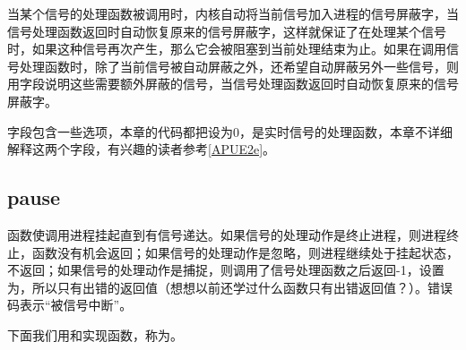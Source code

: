 当某个信号的处理函数被调用时，内核自动将当前信号加入进程的信号屏蔽字，当信号处理函数返回时自动恢复原来的信号屏蔽字，这样就保证了在处理某个信号时，如果这种信号再次产生，那么它会被阻塞到当前处理结束为止。如果在调用信号处理函数时，除了当前信号被自动屏蔽之外，还希望自动屏蔽另外一些信号，则用字段说明这些需要额外屏蔽的信号，当信号处理函数返回时自动恢复原来的信号屏蔽字。



字段包含一些选项，本章的代码都把设为0，是实时信号的处理函数，本章不详细解释这两个字段，有兴趣的读者参考\hyperlink{db.bi01.bibli.apue}{[APUE2e]}。


\subsection{pause}
%



函数使调用进程挂起直到有信号递达。如果信号的处理动作是终止进程，则进程终止，函数没有机会返回；如果信号的处理动作是忽略，则进程继续处于挂起状态，不返回；如果信号的处理动作是捕捉，则调用了信号处理函数之后返回-1，设置为，所以只有出错的返回值（想想以前还学过什么函数只有出错返回值？）。错误码表示“被信号中断”。



下面我们用和实现函数，称为。




